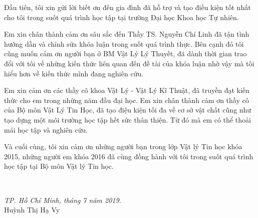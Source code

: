 Đầu tiên, tôi xin gửi lời biết ơn đến gia đình đã hỗ trợ và tạo điều kiện tốt nhất cho tôi trong suốt quá trình học tập 
tại trường Đại học Khoa học Tự nhiên.\par
Em xin chân thành cảm ơn sâu sắc đến Thầy TS. Nguyễn Chí Linh 
đã tận tình hướng dẫn và chỉnh sửa khóa luận trong suốt quá trình thực.
Bên cạnh đó tôi cũng muốn cảm ơn người bạn ở BM Vật Lý Lý Thuyết, 
đã dành thời gian trao đổi với tôi về những kiến thức liên quan đến đề tài của khóa luận
nhờ vậy mà tôi hiểu hơn về kiến thức mình đang nghiên cứu.\par
Em xin cảm ơn các thầy cô khoa Vật Lý - Vật Lý Kĩ Thuật, đã truyền đạt kiến thức cho em trong những năm đầu đại học.
Em xin chân thành cảm ơn thầy cô của Bộ môn Vật Lý Tin Học,
đã tạo điệu kiện tối đa về cơ sở vật chất cũng như tạo dựng một môi trường học tập hết sức thân thiện. 
Từ đó mà em có thể thoải mái học tập và nghiên cứu.\par
Và cuối cùng, tôi xin cảm ơn những người bạn trong lớp Vật lý Tin học khóa 2015, 
những người em khóa 2016 đã cùng đồng hành với tôi trong suốt quá trình học tập tại Bộ môn Vật lý Tin học.\par~\par
\hfill
\begin{minipage}[H]{0.5\textwidth}
 \centering
 \textsl{TP. Hồ Chí Minh, tháng 7 năm 2019.}\\
 \vspace{1cm}
 Huỳnh Thị Hạ Vy 
\end{minipage}

